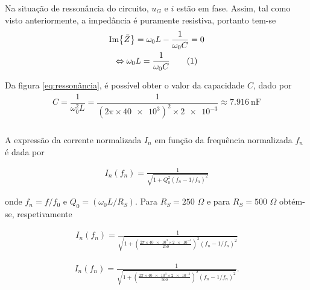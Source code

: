 \documentclass[a4paper, titlepage, portuguese]{article}
\newcommand{\eq}{\Leftrightarrow} %
\newcommand\numberthis{\addtocounter{equation}{1}\tag{\theequation}}
\begin{document}
	\subsubsection{}
		\par
		Na situação de ressonância do circuito, $u_G$ e $i$ estão em fase.  Assim, tal como visto anteriormente, a impedância é puramente resistiva, portanto tem-se
		\begin{gather*}
			\Im{\bar{Z}} = \omega_0 L - \dfrac{1}{\omega_0 C} = 0 \\
			\eq \omega_0 L = \dfrac{1}{\omega_0 C} \numberthis \label{eq:ressonância}
		\end{gather*}
		\par
		Da figura \ref{eq:ressonância}, é possível obter o valor da capacidade $C$, dado por
		\begin{gather*}
			C = \dfrac{1}{\omega_0^2 L} = \dfrac{1}{\left(2\pi \times \num{40e3}\right)^2 \times \num{2e-3}} \approx \SI{7.916}{\nano\farad}
		\end{gather*}

	\subsubsection{}
		\par
		A expressão da corrente normalizada $I_n$ em função da frequência normalizada $f_n$ é dada por
		
		\begin{align}
			I _ { n } \left( f _ { n } \right) = \frac { 1} { \sqrt { 1+ Q _ { 0} ^ { 2} \left( f _ { n } - 1/ f _ { n } \right) ^ { 2} } }
		\end{align}

		onde $ f _ { n } = f / f _ { 0} \hspace{4pt}\text{e}\hspace{4pt}  Q _ { 0} = \left( \omega _ { 0} L / R _ { S } \right)$.
		Para $R_S = 250\hspace{4pt}\Omega$ e para $R_S = 500\hspace{4pt}\Omega$ obtém-se, respetivamente
		
		\begin{align}
			I _ { n } \left( f _ { n } \right) = \frac {1} {  \sqrt { 1+ \left(\frac{2\pi \times \num{40e3} \times \num{2e-3}}{250} \right)^{2}  \left( f _ { n } - 1/ f _ { n } \right) ^ { 2} }}
		\end{align}
		
		\begin{align}
			I _ { n } \left( f _ { n } \right) = \frac {1} {  \sqrt { 1+ \left(\frac{2\pi \times \num{40e3} \times \num{2e-3}}{500} \right)^{2}   \left( f _ { n } - 1/ f _ { n } \right) ^ { 2} }}.
		\end{align}
\end{document}
